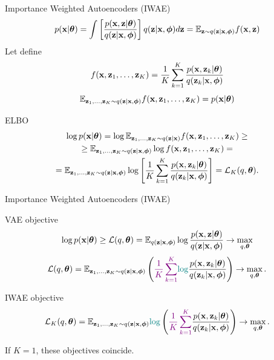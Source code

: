 \begin{frame}{Importance Weighted Autoencoders (IWAE)}
		\[
			p(\mathbf{x} | \boldsymbol{\theta}) = \int \left[\frac{p(\mathbf{x}, \mathbf{z} | \boldsymbol{\theta})}{q(\mathbf{z} | \mathbf{x}, \boldsymbol{\phi})} \right] q(\mathbf{z} | \mathbf{x}, \boldsymbol{\phi}) d\mathbf{z} = \mathbb{E}_{\mathbf{z} \sim q(\mathbf{z} | \mathbf{x}, \boldsymbol{\phi})} f(\mathbf{x}, \mathbf{z})
		\]
	Let define
	\[
	f(\mathbf{x}, \mathbf{z}_1, \dots, \mathbf{z}_K) = \frac{1}{K} \sum_{k=1}^K \frac{p(\mathbf{x}, \mathbf{z}_k | \boldsymbol{\theta})}{q(\mathbf{z}_k | \mathbf{x}, \boldsymbol{\phi})}
	\]
	\[
		\mathbb{E}_{\mathbf{z}_1, \dots, \mathbf{z}_K \sim q(\mathbf{z} | \mathbf{x}, \boldsymbol{\phi})} f(\mathbf{x}, \mathbf{z}_1, \dots, \mathbf{z}_K) = p(\mathbf{x} | \boldsymbol{\theta})
	\]
	\vspace{-0.3cm}
	\begin{block}{ELBO}
		\vspace{-0.5cm}
		\begin{multline*}
			\log p(\mathbf{x} | \boldsymbol{\theta}) = \log \mathbb{E}_{\mathbf{z}_1, \dots, \mathbf{z}_K \sim q(\mathbf{z} | \mathbf{x})} f(\mathbf{x}, \mathbf{z}_1, \dots, \mathbf{z}_K) \geq \\
			\geq \mathbb{E}_{\mathbf{z}_1, \dots, \mathbf{z}_K \sim q(\mathbf{z} | \mathbf{x}, \boldsymbol{\phi})} \log f(\mathbf{x}, \mathbf{z}_1, \dots, \mathbf{z}_K) = \\
			= \mathbb{E}_{\mathbf{z}_1, \dots, \mathbf{z}_K \sim q(\mathbf{z} | \mathbf{x}, \boldsymbol{\phi})} \log \left[\frac{1}{K} \sum_{k=1}^K\frac{p(\mathbf{x}, \mathbf{z}_k | \boldsymbol{\theta})}{q(\mathbf{z}_k | \mathbf{x}, \boldsymbol{\phi})} \right] = \mathcal{L}_K(q, \boldsymbol{\theta}).
		\end{multline*}
	\end{block}
\end{frame}
\begin{frame}{Importance Weighted Autoencoders (IWAE)}
	\begin{block}{VAE objective}
		\vspace{-0.2cm}
		\[
		\log p(\mathbf{x} | \boldsymbol{\theta}) \geq \mathcal{L} (q, \boldsymbol{\theta})  = \mathbb{E}_{q(\mathbf{z} | \mathbf{x}, \boldsymbol{\phi})} \log \frac{p(\mathbf{x}, \mathbf{z} | \boldsymbol{\theta})}{q(\mathbf{z}| \mathbf{x}, \boldsymbol{\phi})} \rightarrow \max_{q, \boldsymbol{\theta}}
		\]
		\[
		\mathcal{L} (q, \boldsymbol{\theta})  = \mathbb{E}_{\mathbf{z}_1, \dots, \mathbf{z}_K \sim q(\mathbf{z} | \mathbf{x}, \boldsymbol{\phi})} \left( {\color{violet}\frac{1}{K}\sum_{k=1}^K} {\color{teal}\log} \frac{p(\mathbf{x}, \mathbf{z}_k | \boldsymbol{\theta})}{q(\mathbf{z}_k| \mathbf{x}, \boldsymbol{\phi})} \right) \rightarrow \max_{q, \boldsymbol{\theta}}.
		\]
		\vspace{-0.2cm}
	\end{block}
	\begin{block}{IWAE objective}
		\vspace{-0.2cm}
		\[
			\mathcal{L}_K (q, \boldsymbol{\theta})  = \mathbb{E}_{\mathbf{z}_1, \dots, \mathbf{z}_K \sim q(\mathbf{z} | \mathbf{x}, \boldsymbol{\phi})} {\color{teal}\log} \left( {\color{violet}\frac{1}{K}\sum_{k=1}^K}\frac{p(\mathbf{x}, \mathbf{z}_k | \boldsymbol{\theta})}{q(\mathbf{z}_k| \mathbf{x}, \boldsymbol{\phi})} \right) \rightarrow \max_{q, \boldsymbol{\theta}}.
		\]
	\end{block}
	If $K=1$, these objectives coincide.

\end{frame}
